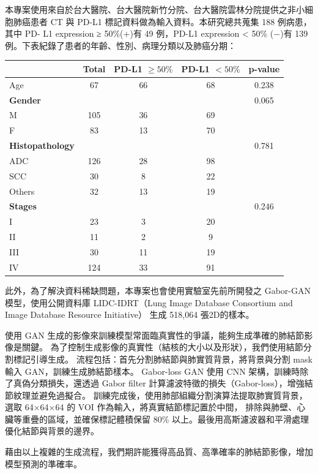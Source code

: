 \documentclass[12pt,a4paper]{article}
\begin{document}
本專案使用來自於台大醫院、台大醫院新竹分院、台大醫院雲林分院提供之非小細胞肺癌患者 CT 與 PD-L1 標記資料做為輸入資料。本研究總共蒐集 188 例病患，其中 PD-
L1 expression ≥ 50\%(+)有 49 例，PD-L1 expression < 50\% (−)有 139 例。下表紀錄了患者的年齡、性別、病理分類以及肺癌分期：

\begin{table}[h]
\centering
\begin{tabular}{lcccc}
\toprule
 & Total & PD-L1 $\geq 50\%$ & PD-L1 $< 50\%$ & p-value \\
\midrule
Age & 67 & 66 & 68 & 0.238 \\
\midrule
\textbf{Gender} & & & & 0.065 \\
\quad M & 105 & 36 & 69 & \\
\quad F & 83 & 13 & 70 & \\
\midrule
\textbf{Histopathology} & & & & 0.781 \\
\quad ADC & 126 & 28 & 98 & \\
\quad SCC & 30 & 8 & 22 & \\
\quad Others & 32 & 13 & 19 & \\
\midrule
\textbf{Stages} & & & & 0.246 \\
\quad I & 23 & 3 & 20 & \\
\quad II & 11 & 2 & 9 & \\
\quad III & 30 & 11 & 19 & \\
\quad IV & 124 & 33 & 91 & \\
\bottomrule
\end{tabular}
\end{table}
\newpage
此外，為了解決資料稀缺問題，本專案也會使用實驗室先前所開發之 Gabor-GAN 模型，使用公開資料庫
LIDC-IDRT（Lung Image Database Consortium and Image Database Resource Initiative） 生成 518,064 張2D的樣本。

使用 GAN 生成的影像來訓練模型常面臨真實性的爭議，能夠生成準確的肺結節影像是關鍵。
為了控制生成影像的真實性（結核的大小以及形狀），我們使用結節分割標記引導生成。
流程包括：首先分割肺結節與肺實質背景，將背景與分割 mask 輸入 GAN，訓練生成肺結節樣本。
Gabor-loss GAN 使用 CNN 架構，訓練時除了真偽分類損失，還透過 Gabor filter 計算濾波特徵的損失（Gabor-loss），增強結節紋理並避免過擬合。
訓練完成後，使用肺部組織分割演算法提取肺實質背景，選取 64$\times$64$\times$64 的 VOI 作為輸入，將真實結節標記置於中間，
排除與肺壁、心臟等重疊的區域，並確保標記體積保留 80\% 以上。最後用高斯濾波器和平滑處理優化結節與背景的邊界。

藉由以上複雜的生成流程，我們期許能獲得高品質、高準確率的肺結節影像，增加模型預測的準確率。
\end{document}
